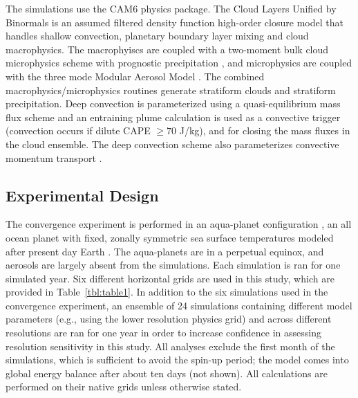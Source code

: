 \documentclass[alpha-refs]{wiley-article}
\begin{document}
The simulations use the CAM6 physics package. The Cloud Layers Unified by Binormals \citep[CLUBB][]{GETAL2002JAS,BOG2013JCLIM} is an assumed filtered density function \citep{G1992JFM} high-order closure model that handles shallow convection, planetary boundary layer mixing and cloud macrophysics. The macrophyiscs are coupled with a two-moment bulk cloud microphysics scheme with prognostic precipitation \citep{MG2}, and microphysics are coupled with the three mode Modular Aerosol Model \citep{MAM}. The combined macrophysics/microphysics routines generate stratiform clouds and stratiform precipitation. Deep convection is parameterized using a quasi-equilibrium mass flux scheme \citep{ZM1995AO} and an entraining plume calculation \citep[referred to as the dilute convective available potential energy, or {\em{dilute CAPE}} hereafter;][]{RB1992JAS, NRJ2008JC} is used as a convective trigger (convection occurs if dilute CAPE $\geq 70$ J/kg), and for closing the mass fluxes in the cloud ensemble. The deep convection scheme also parameterizes convective momentum transport \citep{RR2008JC}.

\subsection{Experimental Design}

The convergence experiment is performed in an aqua-planet configuration \citep{NH2000ASL,MWO2016JAMES}, an all ocean planet with fixed, zonally symmetric sea surface temperatures modeled after present day Earth \citep[$QOBS$ in][]{NH2000ASL}. The aqua-planets are in a perpetual equinox, and aerosols are largely absent from the simulations. Each simulation is ran for one simulated year. Six different horizontal grids are used in this study, which are provided in Table~\ref{tbl:table1}. In addition to the six simulations used in the convergence experiment, an ensemble of 24 simulations containing different model parameters (e.g., using the lower resolution physics grid) and across different resolutions are ran for one year in order to increase confidence in assessing resolution sensitivity in this study. All analyses exclude the first month of the simulations, which is sufficient to avoid the spin-up period; the model comes into global energy balance after about ten days (not shown). All calculations are performed on their native grids unless otherwise stated.
\end{document}
